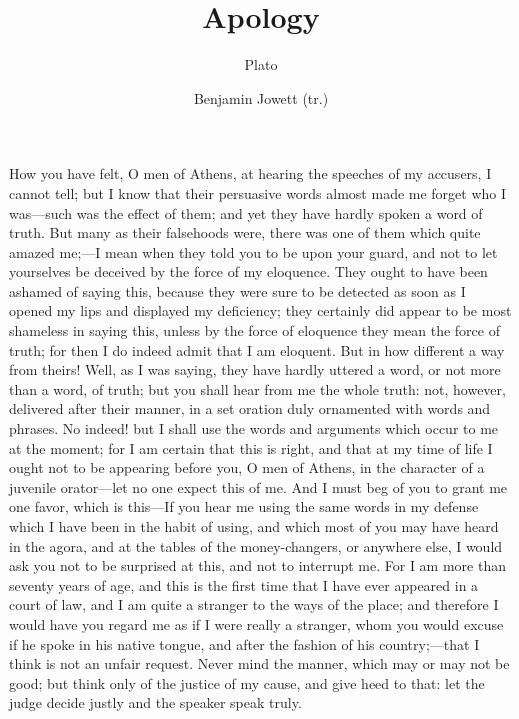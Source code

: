 \documentclass[12pt]{article}
\title{\Huge\swshape Apology}
\author{Plato \and Benjamin Jowett (tr.)}
\date{}
\begin{document}
\maketitle

\noindent How you have felt, O men of Athens, at hearing the speeches of my
accusers, I cannot tell; but I know that their persuasive words almost
made me forget who I was---such was the effect of them; and yet they
have hardly spoken a word of truth. But many as their falsehoods were,
there was one of them which quite amazed me;---I mean when they told
you to be upon your guard, and not to let yourselves be deceived by
the force of my eloquence. They ought to have been ashamed of saying
this, because they were sure to be detected as soon as I opened my
lips and displayed my deficiency; they certainly did appear to be
most shameless in saying this, unless by the force of eloquence they
mean the force of truth; for then I do indeed admit that I am eloquent.
But in how different a way from theirs! Well, as I was saying, they
have hardly uttered a word, or not more than a word, of truth; but
you shall hear from me the whole truth: not, however, delivered after
their manner, in a set oration duly ornamented with words and phrases.
No indeed! but I shall use the words and arguments which occur to
me at the moment; for I am certain that this is right, and that at
my time of life I ought not to be appearing before you, O men of Athens,
in the character of a juvenile orator---let no one expect this of
me. And I must beg of you to grant me one favor, which is this---If
you hear me using the same words in my defense which I have been in
the habit of using, and which most of you may have heard in the agora,
and at the tables of the money-changers, or anywhere else, I would
ask you not to be surprised at this, and not to interrupt me. For
I am more than seventy years of age, and this is the first time that
I have ever appeared in a court of law, and I am quite a stranger
to the ways of the place; and therefore I would have you regard me
as if I were really a stranger, whom you would excuse if he spoke
in his native tongue, and after the fashion of his country;---that
I think is not an unfair request. Never mind the manner, which may
or may not be good; but think only of the justice of my cause, and
give heed to that: let the judge decide justly and the speaker speak
truly.
\end{document}
